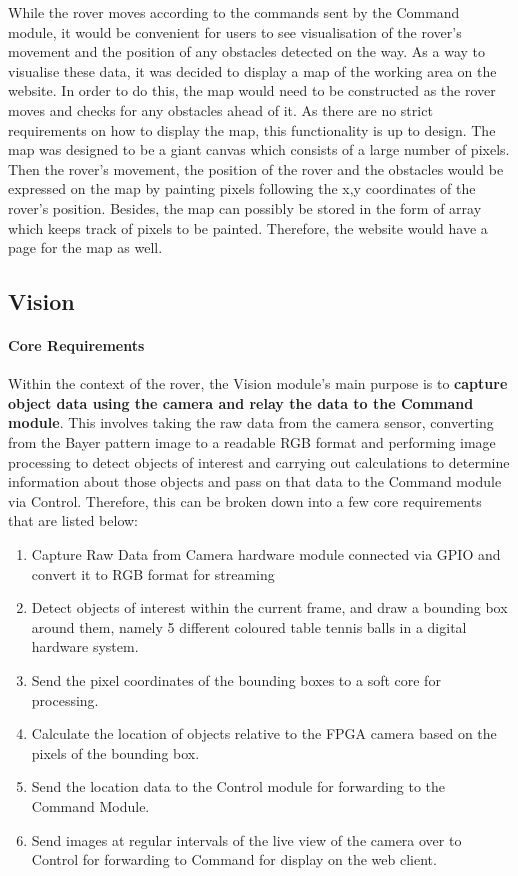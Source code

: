 \documentclass[a4paper]{article}
\begin{document}
While the rover moves according to the commands sent by the Command module, it would be convenient for 
users to see visualisation of the rover's movement and the position of any obstacles detected 
on the way. As a way to visualise these data, it was decided to display a map of the working area on 
the website. In order to do this, the map would need to be constructed as the rover moves and checks 
for any obstacles ahead of it. As there are no strict requirements on how to display the map, 
this functionality is up to design. The map was designed to be a giant canvas which consists of a large 
number of pixels. Then the rover's movement, the position of the rover and the obstacles would be expressed 
on the map by painting pixels following the x,y coordinates of the rover's position. Besides, the 
map can possibly be stored in the form of array which keeps track of pixels to be painted. Therefore, the 
website would have a page for the map as well. 

\subsection{Vision}
\paragraph*{Core Requirements}
\vspace{-6pt}
Within the context of the rover, the Vision module's main purpose is to \textbf{capture 
object data using the camera and relay the data to the Command module}. This involves 
taking the raw data from the camera sensor, converting from the Bayer pattern image to 
a readable RGB format and performing image processing to detect objects of interest and
carrying out calculations to determine information about those objects and pass on 
that data to the Command module via Control. Therefore, this can be broken down into a few
core requirements that are listed below:

\begin{enumerate}
    \item Capture Raw Data from Camera hardware module connected via GPIO and convert 
    it to RGB format for streaming
    \item Detect objects of interest within the current frame, and draw a bounding box around them, 
    namely 5 different coloured table tennis balls in a digital hardware system.
    \item Send the pixel coordinates of the bounding boxes to a soft core for processing.
    \item Calculate the location of objects relative to the FPGA camera based on the 
    pixels of the bounding box. 
    \item Send the location data to the Control module for forwarding to the Command Module. 
    \item Send images at regular intervals of the live view of the camera over to Control for
    forwarding to Command for display on the web client.
\end{enumerate}
\end{document}

